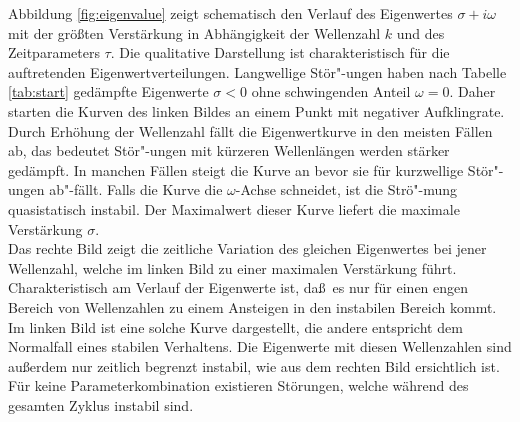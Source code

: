 \documentclass[10pt,a5paper,oneside,draft]{book}
\numberwithin{equation}{chapter}
\begin{document}
Abbildung \ref{fig:eigenvalue} zeigt schematisch den Verlauf des Eigenwertes $\sigma+i\omega$ mit der gr\"o\ss ten Verst\"arkung in Abh\"angigkeit der Wellenzahl $k$ und des Zeitparameters $\tau$.
Die qualitative Darstellung ist charakteristisch f\"ur die auftretenden Eigenwertverteilungen.
Langwellige St\"or"-ungen haben nach Tabelle \ref{tab:start} ged\"ampfte Eigenwerte $\sigma<0$ ohne schwingenden Anteil $\omega=0$.
Daher starten die Kurven des linken Bildes an einem Punkt mit negativer Aufklingrate.
Durch Erh\"ohung der Wellenzahl f\"allt die Eigenwertkurve in den meisten F\"allen ab, das bedeutet St\"or"-ungen mit k\"urzeren Wellenl\"angen werden st\"arker ged\"ampft.
In manchen F\"allen steigt die Kurve an bevor sie f\"ur kurzwellige St\"or"-ungen ab"-f\"allt.
Falls die Kurve die $\omega$-Achse schneidet, ist die Str\"o"-mung quasistatisch instabil.
Der Maximalwert dieser Kurve liefert die maximale Verst\"arkung $\sigma$.\\
Das rechte Bild zeigt die zeitliche Variation des gleichen Eigenwertes bei jener Wellenzahl, welche im linken Bild zu einer maximalen Verst\"arkung f\"uhrt.\\
Charakteristisch am Verlauf der Eigenwerte ist, da\ss\ es nur f\"ur einen engen Bereich von Wellenzahlen zu einem Ansteigen in den instabilen Bereich kommt.
Im linken Bild ist eine solche Kurve dargestellt, die andere entspricht dem Normalfall eines stabilen Verhaltens.
Die Eigenwerte mit diesen Wellenzahlen sind au\ss erdem nur zeitlich begrenzt instabil, wie aus dem rechten Bild ersichtlich ist.
F\"ur keine Parameterkombination existieren St\"orungen, welche w\"ahrend des gesamten Zyklus instabil sind.\\
\end{document}
